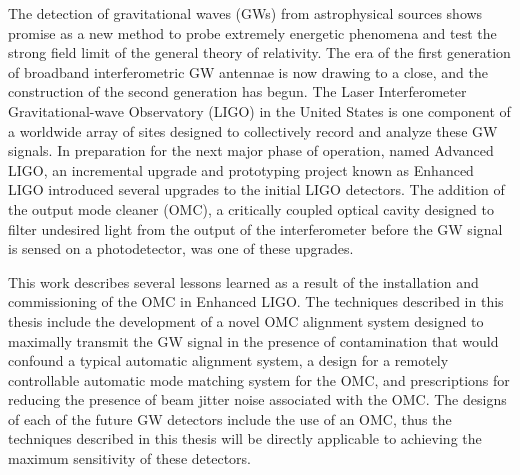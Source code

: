 % 
% 
%

The detection of gravitational waves (GWs) from astrophysical sources shows promise as a new method to probe extremely energetic phenomena and test the strong field limit of the general theory of relativity. %
The era of the first generation of broadband interferometric GW antennae is now drawing to a close, and the construction of the second generation has begun. %
The Laser Interferometer Gravitational-wave Observatory (LIGO) in the United States is one component of a worldwide array of sites designed to collectively record and analyze these GW signals. %
In preparation for the next major phase of operation, named Advanced LIGO, an incremental upgrade and prototyping project known as Enhanced LIGO introduced several upgrades to the initial LIGO detectors. %
The addition of the output mode cleaner (OMC), a critically coupled optical cavity designed to filter undesired light from the output of the interferometer before the GW signal is sensed on a photodetector, was one of these upgrades.

This work describes several lessons learned as a result of the installation and commissioning of the OMC in Enhanced LIGO. %
The techniques described in this thesis include the development of a novel OMC alignment system designed to maximally transmit the GW signal in the presence of contamination that would confound a typical automatic alignment system, a design for a remotely controllable automatic mode matching system for the OMC, and prescriptions for reducing the presence of beam jitter noise associated with the OMC. %
The designs of each of the future GW detectors include the use of an OMC, thus the techniques described in this thesis will be directly applicable to achieving the maximum sensitivity of these detectors.
